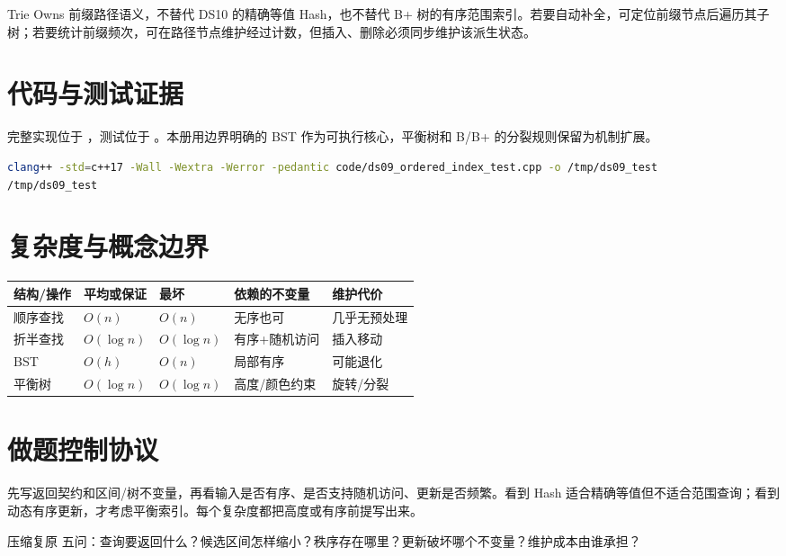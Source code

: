 \documentclass[UTF8,fontset=none,11pt,a4paper]{ctexart}
\begin{document}
Trie Owns 前缀路径语义，不替代 DS10 的精确等值 Hash，也不替代 B+ 树的有序范围索引。若要自动补全，可定位前缀节点后遍历其子树；若要统计前缀频次，可在路径节点维护经过计数，但插入、删除必须同步维护该派生状态。

\section{代码与测试证据}
完整实现位于 ，测试位于 。本册用边界明确的 BST 作为可执行核心，平衡树和 B/B+ 的分裂规则保留为机制扩展。


\begin{lstlisting}[language=bash]
clang++ -std=c++17 -Wall -Wextra -Werror -pedantic code/ds09_ordered_index_test.cpp -o /tmp/ds09_test
/tmp/ds09_test
\end{lstlisting}

\section{复杂度与概念边界}
\begin{center}\small
\begin{tabularx}{\linewidth}{L{2.5cm}C{1.8cm}C{1.8cm}YY}\toprule
结构/操作 & 平均或保证 & 最坏 & 依赖的不变量 & 维护代价\\\midrule
顺序查找 & $O(n)$ & $O(n)$ & 无序也可 & 几乎无预处理\\
折半查找 & $O(\log n)$ & $O(\log n)$ & 有序+随机访问 & 插入移动\\
BST & $O(h)$ & $O(n)$ & 局部有序 & 可能退化\\
平衡树 & $O(\log n)$ & $O(\log n)$ & 高度/颜色约束 & 旋转/分裂\\\bottomrule\end{tabularx}\end{center}

\section{做题控制协议}
先写返回契约和区间/树不变量，再看输入是否有序、是否支持随机访问、更新是否频繁。看到 Hash 适合精确等值但不适合范围查询；看到动态有序更新，才考虑平衡索引。每个复杂度都把高度或有序前提写出来。
\begin{corebox}{压缩复原}
五问：查询要返回什么？候选区间怎样缩小？秩序存在哪里？更新破坏哪个不变量？维护成本由谁承担？
\end{corebox}
\end{document}
